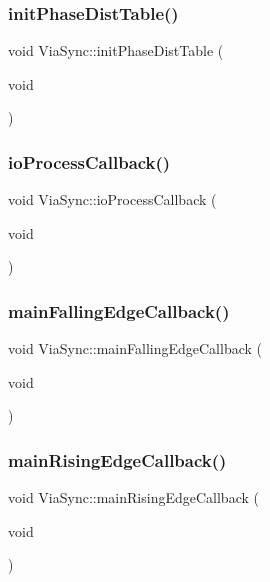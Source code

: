 \subsubsection{\texorpdfstring{init\+Phase\+Dist\+Table()}{initPhaseDistTable()}}
{\footnotesize\ttfamily void Via\+Sync\+::init\+Phase\+Dist\+Table (\begin{DoxyParamCaption}\item[{void}]{ }\end{DoxyParamCaption})}

\mbox{\label{class_via_sync_a31d6b55ab3680414fdb82751a3d831b0}} 
\subsubsection{\texorpdfstring{io\+Process\+Callback()}{ioProcessCallback()}}
{\footnotesize\ttfamily void Via\+Sync\+::io\+Process\+Callback (\begin{DoxyParamCaption}\item[{void}]{ }\end{DoxyParamCaption})}

\mbox{\label{class_via_sync_a7cbf13fbfc58835d97976b478ee00dd6}} 
\subsubsection{\texorpdfstring{main\+Falling\+Edge\+Callback()}{mainFallingEdgeCallback()}}
{\footnotesize\ttfamily void Via\+Sync\+::main\+Falling\+Edge\+Callback (\begin{DoxyParamCaption}\item[{void}]{ }\end{DoxyParamCaption})}

\mbox{\label{class_via_sync_acf9bcb2f9e7ff050906e527ca2418875}} 
\subsubsection{\texorpdfstring{main\+Rising\+Edge\+Callback()}{mainRisingEdgeCallback()}}
{\footnotesize\ttfamily void Via\+Sync\+::main\+Rising\+Edge\+Callback (\begin{DoxyParamCaption}\item[{void}]{ }\end{DoxyParamCaption})}

